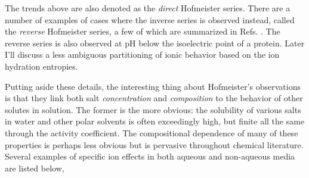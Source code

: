 \begin{intro}
    The trends above are also denoted as the \emph{direct} Hofmeister series. There are a number of examples of cases where the inverse series is observed instead, called the
    \emph{reverse} Hofmeister series, a few of which are summarized in Refs. \cite{heyda2010reversal,parsons2009direct,schwierz2016reversed}. The reverse series is also observed at pH
    below the isoelectric point of a protein\cite{salis2014models}. Later I'll discuss a less ambiguous partitioning of ionic behavior based on the ion hydration entropies.
    
    Putting aside these details, the interesting thing about Hofmeister's observations is that they link both salt \emph{concentration} and \emph{composition} to the behavior of 
    other solutes in solution. The former is the more obvious: the solubility of various salts in water and other polar solvents is often exceedingly high, but finite all the same 
    through the activity coefficient\cite{burgess1978metal}. The compositional dependence of many of these properties is perhaps less obvious but is pervasive throughout chemical
    literature. Several examples of specific ion effects in both aqueous and non-aqueous media are listed below,
    

\end{intro}

